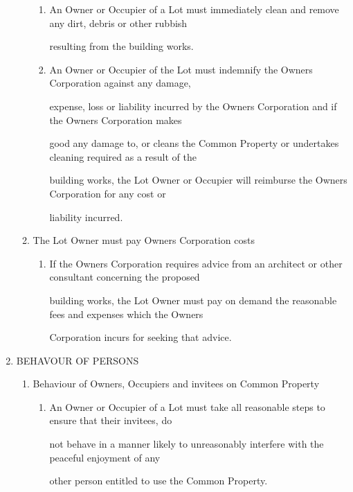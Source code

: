 \documentclass{article}
\begin{document}
\begin{enumerate}[label=\arabic*.]
\begin{enumerate}[label=\arabic{enumi}.\arabic*.]
\begin{enumerate}[label=(\arabic*)]
\item  An Owner or Occupier of a Lot must immediately clean and remove any dirt, debris or other rubbish 

resulting from the building works. 

\item  An Owner or Occupier of the Lot must indemnify the Owners Corporation against any damage, 

expense, loss or liability incurred by the Owners Corporation and if the Owners Corporation makes 

good any damage to, or cleans the Common Property or undertakes cleaning required as a result of the 

building works, the Lot Owner or Occupier will reimburse the Owners Corporation for any cost or 

liability incurred. 

\end{enumerate}
\item  The Lot Owner must pay Owners Corporation costs 

\begin{enumerate}[label=(\arabic*)]
\item  If the Owners Corporation requires advice from an architect or other consultant concerning the proposed 

building works, the Lot Owner must pay on demand the reasonable fees and expenses which the Owners 

Corporation incurs for seeking that advice. 

\end{enumerate}
\end{enumerate}
\item  BEHAVOUR OF PERSONS 

\begin{enumerate}[label=\arabic{enumi}.\arabic*.]
\item  Behaviour of Owners, Occupiers and invitees on Common Property 

\begin{enumerate}[label=(\arabic*)]
\item  An Owner or Occupier of a Lot must take all reasonable steps to ensure that their invitees, do 

not behave in a manner likely to unreasonably interfere with the peaceful enjoyment of any 

other person entitled to use the Common Property. 


\end{enumerate}
\end{enumerate}
\end{enumerate}
\end{document}
